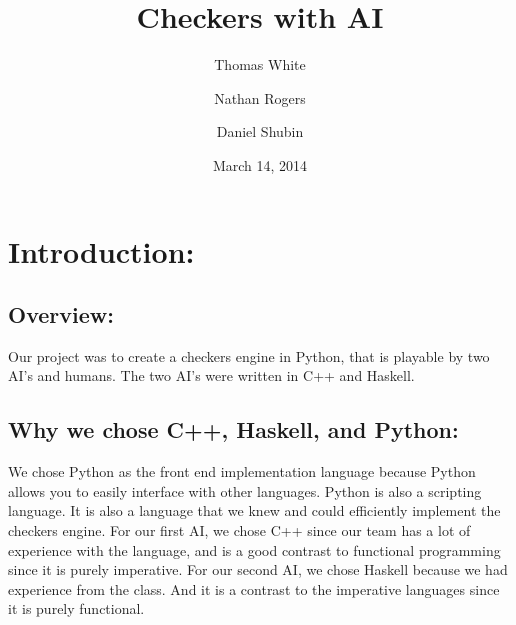 \documentclass[12pt]{article}
\begin{document}
\begin{titlepage}
\title{Checkers with AI}
\date{March 14, 2014}
\author{Thomas White
    \and Nathan Rogers
    \and Daniel Shubin}
\maketitle
\end{titlepage}

\section{Introduction:}
    \subsection{Overview:}
        Our project was to create a checkers engine in Python,
        that is playable by two AI's and humans. The two AI's
        were written in C++ and Haskell.
    \subsection{Why we chose C++, Haskell, and Python:}
        We chose Python as the front end implementation language
        because Python allows you to easily interface with other
        languages. Python is also a scripting language.
        It is also a language that we knew and could efficiently
        implement the checkers engine.
        For our first AI, we chose C++ since our team has a lot of
        experience with the language, and is a good contrast to functional
        programming since it is purely imperative.
        For our second AI, we chose Haskell because we had experience from
        the class. And it is a contrast to the imperative languages since
        it is purely functional.
\end{document}

